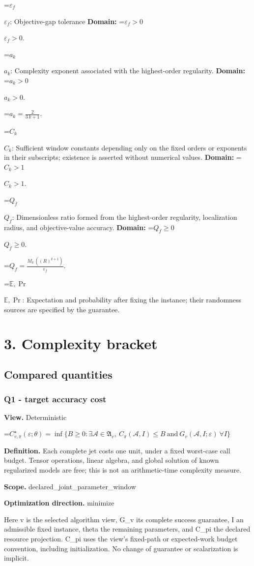 \documentclass[10pt,a4paper]{article}
\newcommand{\AtlasMath}[1]{\par\begingroup\centering\setbox0=\hbox{$\displaystyle #1$}\ifdim\wd0>1.4\linewidth\typeout{ATLAS WIDE FORMULA: \the\wd0}\fi\ifdim\wd0>\linewidth\resizebox{\linewidth}{!}{\box0}\else\box0\fi\par\endgroup}
\newcommand{\AtlasInlineMath}[1]{\begingroup\setbox0=\hbox{$#1$}\ifdim\wd0>.4\linewidth\endgroup\AtlasMath{#1}\else\endgroup$#1$\fi}
\begin{document}
\AtlasInlineMath{\varepsilon_f}: Objective-gap tolerance \textbf{Domain:} \AtlasInlineMath{\varepsilon_f>0}.

\AtlasInlineMath{a_k}: Complexity exponent associated with the highest-order regularity. \textbf{Domain:} \AtlasInlineMath{a_k>0}.


\AtlasMath{a_k=\frac{2}{3\,k+1}.}


\AtlasInlineMath{C_{k}}: Sufficient window constants depending only on the fixed orders or exponents in their subscripts; existence is asserted without numerical values. \textbf{Domain:} \AtlasInlineMath{C_{k}>1}.

\AtlasInlineMath{Q_f}: Dimensionless ratio formed from the highest-order regularity, localization radius, and objective-value accuracy. \textbf{Domain:} \AtlasInlineMath{Q_f\ge0}.


\AtlasMath{Q_f=\frac{M_k\,((R)^{k+1})}{\varepsilon_f}.}


\AtlasInlineMath{\mathbb{E},\Pr}: Expectation and probability after fixing the instance; their randomness sources are specified by the guarantee.

\section{3. Complexity bracket}
\subsection{Compared quantities}
\subsubsection{Q1 - target accuracy cost}
\textbf{View.} Deterministic

\AtlasMath{C^\star_{v,\pi}(\varepsilon;\theta)=\inf\{B\ge0:\exists\mathcal A\in\mathfrak A_v,\ C_\pi(\mathcal A,I)\le B\ \text{and}\ G_v(\mathcal A,I;\varepsilon)\ \forall I\}}
\textbf{Definition.} Each complete jet costs one unit, under a fixed worst-case call budget. Tensor operations, linear algebra, and global solution of known regularized models are free; this is not an arithmetic-time complexity measure.

\textbf{Scope.} declared\_joint\_parameter\_window

\textbf{Optimization direction.} minimize

Here v is the selected algorithm view, G\_v its complete success guarantee, I an admissible fixed instance, theta the remaining parameters, and C\_pi the declared resource projection. C\_pi uses the view's fixed-path or expected-work budget convention, including initialization. No change of guarantee or scalarization is implicit.
\end{document}
